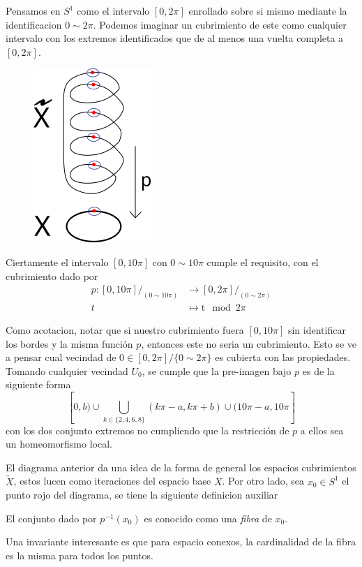 \begin{ejemplo} \label{ej:10pi}
  Pensamos en \(S^1\) como el intervalo \([0, 2 \pi]\) enrollado sobre
  si mismo mediante la identificacion \(0 \sim 2 \pi\). Podemos imaginar
  un cubrimiento de este como cualquier intervalo con los extremos
  identificados que de al menos una vuelta completa a \([0, 2 \pi]\).
  \begin{figure}[h]
    \centering \includegraphics[scale=0.5]{./imagenes/spring.png}
  \end{figure}
  Ciertamente el intervalo \([0, 10 \pi]\) con \(0 \sim 10 \pi\) cumple
  el requisito, con el cubrimiento dado por
  \begin{align*}
    p : [0, 10 \pi] / _{(0 \sim 10\pi )} &\longrightarrow [0, 2 \pi] / _{(0 \sim 2\pi )} \\
    t &\longmapsto \mathrm t \mod 2 \pi
  \end{align*}

  Como acotacion, notar que si nuestro cubrimiento fuera \([0, 10 \pi]\)
  sin identificar los bordes y la misma función \(p\), entonces este no
  seria un cubrimiento. Esto se ve a pensar cual vecindad de \(0 \in
  [0,2\pi] / \{0 \sim 2\pi\}\) es cubierta con las propiedades. Tomando
  cualquier vecindad \(U_0\), se cumple que la pre-imagen bajo \(p\) es de
  la siguiente forma
  \[
    [0,b) \cup
    \bigcup_{k \in \{2,4,6,8\}} (k\pi - a, k\pi + b)
    \cup (10\pi - a, 10\pi]
  \]
  con los dos conjunto extremos no cumpliendo que la restricción de
  \(p\) a ellos sea un homeomorfismo local.
\end{ejemplo}
El diagrama anterior da una idea de la forma de general los espacios
cubrimientos \(\tilde X\), estos lucen como iteraciones del espacio base
\(X\). Por otro lado, sea \(x_0 \in S^1\) el punto rojo del diagrama, se
tiene la siguiente definicion auxiliar
\begin{definicion}[Fibra]
El conjunto dado por \(p^{-1} (x_0)\) es conocido como una
\emph{fibra} de \(x_0\).
\end{definicion}
\noindent Una invariante interesante es que para espacio conexos, la
cardinalidad de la fibra es la misma para todos los puntos.

